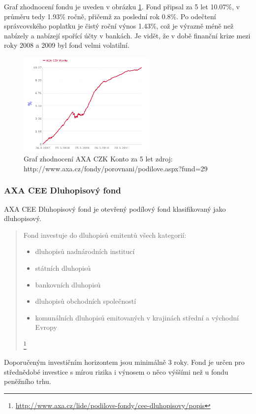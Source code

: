 \documentclass[a4paper,12pt]{article}
\begin{document}
			Graf zhodnocení fondu je uveden v obrázku \ref{axa_czk_konto}. Fond připsal za 5 let 10.07\%, v průměru tedy 1.93\% ročně, přičemž za poslední rok 0.8\%. Po odečtení správcovského poplatku je čistý roční výnos 1.43\%, což je výrazně méně než nabízely a nabízejí spořící účty v bankách. Je vidět, že v době finanční krize mezi roky 2008 a 2009 byl fond velmi volatilní. 
			\begin{figure}[h!]
				\label{axa_czk_konto}

		  	\centering
				\includegraphics[width=0.6\textwidth]{axa_czk_konto.png}			
				\caption{Graf zhodnocení AXA CZK Konto za 5 let zdroj: http://www.axa.cz/fondy/porovnani/podilove.aspx?fund=29}
			\end{figure}
		\subsubsection{AXA CEE Dluhopisový fond}
			AXA CEE Dluhopisový fond je otevřený podílový fond klasifikovaný jako dluhopisový. 
			\begin{quote}
				Fond investuje do dluhopisů emitentů všech kategorií:
				\begin{itemize}
			    \item dluhopisů nadnárodních institucí
			    \item státních dluhopisů
			    \item bankovních dluhopisů
			    \item dluhopisů obchodních společností
			    \item komunálních dluhopisů emitovaných v krajinách střední a východní Evropy			
    	  \end{itemize}
    	  \footnote{\url{http://www.axa.cz/lide/podilove-fondy/cee-dluhopisovy/popis}}
		  \end{quote}						
			
			Doporučeným investičním horizontem jsou minimálně 3 roky. Fond je určen pro střednědobé investice s mírou rizika i výnosem o něco výššími než u fondu peněžního trhu.
			
\end{document}
